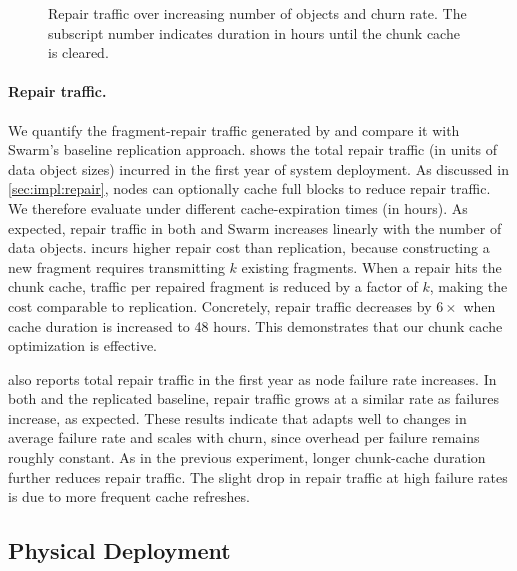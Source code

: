 \begin{figure}
    \caption{Repair traffic over increasing number of objects and churn rate.
    The subscript number indicates duration in hours until the chunk cache is cleared.}
    \ifacm{}\fi
    \label{fig:repair}
\end{figure}

\paragraph{Repair traffic.}
We quantify the fragment-repair traffic generated by \sys and compare it with Swarm's baseline replication approach.
 shows the total repair traffic (in units of data object sizes) incurred in the first year of system deployment.
As discussed in \cref{sec:impl:repair}, \sys nodes can optionally cache full blocks to reduce repair traffic.
We therefore evaluate \sys under different cache-expiration times (in hours).
As expected, repair traffic in both \sys and Swarm increases linearly with the number of data objects.
\sys incurs higher repair cost than replication, because constructing a new fragment requires transmitting $k$ existing fragments.
When a repair hits the chunk cache, traffic per repaired fragment is reduced by a factor of $k$, making the cost comparable to replication.
Concretely, repair traffic decreases by $6\times$ when cache duration is increased to 48 hours.
This demonstrates that our chunk cache optimization is effective.

 also reports total repair traffic in the first year as node failure rate increases.
In both \sys and the replicated baseline, repair traffic grows at a similar rate as failures increase, as expected.
These results indicate that \sys adapts well to changes in average failure rate and scales with churn, since overhead per failure remains roughly constant.
As in the previous experiment, longer chunk-cache duration further reduces repair traffic.
The slight drop in repair traffic at high failure rates is due to more frequent cache refreshes.

\subsection{Physical Deployment}

